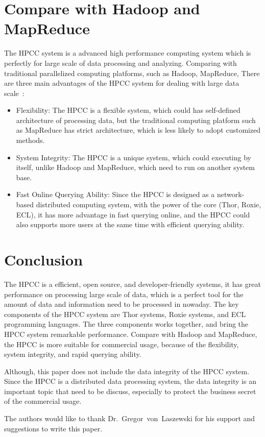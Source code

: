 \section{Compare with Hadoop and MapReduce}
The HPCC system is a advanced high performance computing system which is perfectly for large scale of data processing and analyzing. Comparing with traditional parallelized computing platforms, such as Hadoop, MapReduce, There are three main advantages of the HPCC system for dealing with large data scale~\cite{Intro4}:
\begin{itemize}
	\item Flexibility: The HPCC is a flexible system, which could has self-defined architecture of processing data, but the traditional computing platform such as MapReduce has strict architecture, which is less likely to adopt customized methods.
	\item System Integrity: The HPCC is a unique system, which could executing by itself, unlike Hadoop and MapReduce, which need to run on another system base.
	\item Fast Online Querying Ability: Since the HPCC is designed as a network-based distributed computing system, with the power of the core (Thor, Roxie, ECL), it has more advantage in fast querying online, and the HPCC could also supports more users at the same time with efficient querying ability.
\end{itemize}

\section{Conclusion}
The HPCC is a efficient, open source, and developer-friendly systems, it has great performance on processing large scale of data, which is a perfect tool for the amount of data and information need to be processed in nowaday. The key components of the HPCC system are Thor systems, Roxie systems, and ECL programming languages. The three components works together, and bring the HPCC system remarkable performance. Compare with Hadoop and MapReduce, the HPCC is more suitable for commercial usage, because of the flexibility, system integrity, and rapid querying ability.

Although, this paper does not include the data integrity of the HPCC system. Since the HPCC is a distributed data processing system, the data integrity is an important topic that need to be discuss, especially to protect the business secret of the commercial usage.
\begin{acks}

  The authors would like to thank Dr.~Gregor~von~Laszewski for his
  support and suggestions to write this paper.

\end{acks}


 

